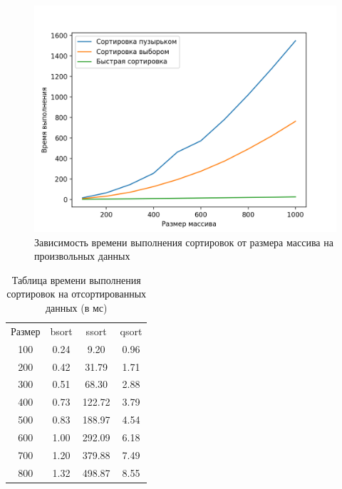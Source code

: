 \documentclass{report}
\begin{document}
\begin{figure}[h!p]
	\centering
	\includegraphics[scale = 0.8]{rand.png}
	\caption{Зависимость времени выполнения сортировок от размера массива на произвольных данных}
	\label{fig:mpr}
\end{figure}

\begin{table} [h!]
	\caption{Таблица времени выполнения сортировок на отсортированных данных (в мс)}
	\begin{center}
	\begin{tabular}{|c c c c|}

		\hline

		Размер & bsort & ssort & qsort  \\ [0.5ex]

100 & 0.24 & 9.20 & 0.96  \\ 
\hline
200 & 0.42 & 31.79 & 1.71  \\ 
\hline
300 & 0.51 & 68.30 & 2.88  \\ 
\hline
400 & 0.73 & 122.72 & 3.79  \\ 
\hline
500 & 0.83 & 188.97 & 4.54  \\ 
\hline
600 & 1.00 & 292.09 & 6.18  \\ 
\hline
700 & 1.20 & 379.88 & 7.49  \\ 
\hline
800 & 1.32 & 498.87 & 8.55  \\ 
\hline

	\hline 
	\end{tabular}
	\end{center}
\end{table}
\end{document}
